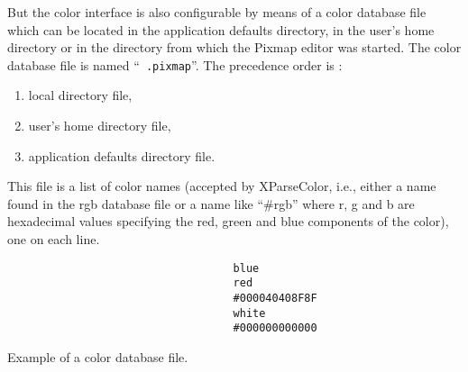 But the color interface is also configurable by means of a color
database file which can be located in the application defaults
directory, in the user's home directory or in the directory from which
the Pixmap editor was started. The color database file is named ``{\tt
.pixmap}''. The precedence order is : 
\begin{enumerate} 
\item local directory file, 
\item user's home directory file,
\item application defaults directory file.
\end{enumerate} 

This file is a list of color names (accepted by XParseColor, i.e.,
either a name found in the rgb database file or a name like ``\#rgb''
where r, g and b are hexadecimal values specifying the red, green and
blue components of the color), one on
each line.

\begin{verbatim} 
                                   blue
                                   red
                                   #000040408F8F
                                   white
                                   #000000000000
\end{verbatim} 
\centerline{Example of a color database file.}

 

